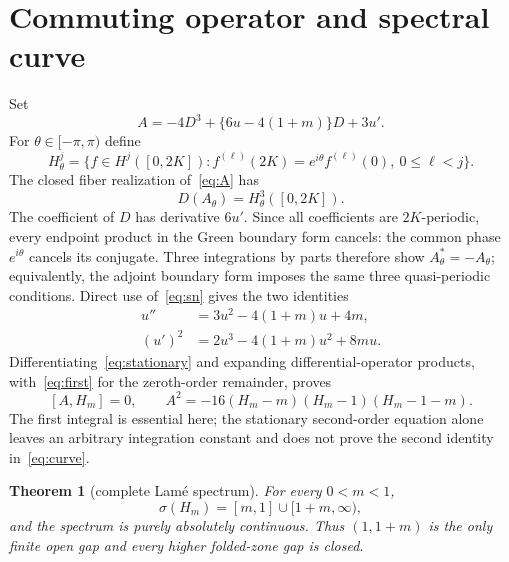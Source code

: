 \documentclass[10pt]{article}
\newtheorem{theorem}{Theorem}
\newcommand{\HH}{H_m}
\begin{document}
\section{Commuting operator and spectral curve}
Set
\begin{equation}\label{eq:A}
 A=-4D^3+\{6u-4(1+m)\}D+3u'.
\end{equation}
For $\theta\in[-\pi,\pi)$ define
\[
 H^j_\theta=\{f\in H^j([0,2K]):
 f^{(\ell)}(2K)=e^{i\theta}f^{(\ell)}(0),\ 0\leq\ell<j\}.
\]
The closed fiber realization of~\eqref{eq:A} has
\begin{equation}\label{eq:A-domain}
 D(A_\theta)=H^3_\theta([0,2K]).
\end{equation}
The coefficient of $D$ has derivative $6u'$.  Since all coefficients are
$2K$-periodic, every endpoint product in the Green boundary form cancels:
the common phase $e^{i\theta}$ cancels its conjugate.  Three integrations by
parts therefore show $A_\theta^*=-A_\theta$; equivalently, the adjoint
boundary form imposes the same three quasi-periodic conditions.  Direct use
of~\eqref{eq:sn} gives the two identities
\begin{align}
 u''&=3u^2-4(1+m)u+4m,\label{eq:stationary}\\
 (u')^2&=2u^3-4(1+m)u^2+8mu.\label{eq:first}
\end{align}
Differentiating~\eqref{eq:stationary} and expanding differential-operator
products, with~\eqref{eq:first} for the zeroth-order remainder, proves
\begin{equation}\label{eq:curve}
 [A,\HH]=0,\qquad
 A^2=-16(\HH-m)(\HH-1)(\HH-1-m).
\end{equation}
The first integral is essential here; the stationary second-order equation
alone leaves an arbitrary integration constant and does not prove the second
identity in~\eqref{eq:curve}.

\begin{theorem}[complete Lam\'e spectrum]\label{thm:spectrum}
For every $0<m<1$,
\begin{equation}\label{eq:spectrum}
 \sigma(\HH)=[m,1]\cup[1+m,\infty),
\end{equation}
and the spectrum is purely absolutely continuous.  Thus $(1,1+m)$ is the
only finite open gap and every higher folded-zone gap is closed.
\end{theorem}
\end{document}
